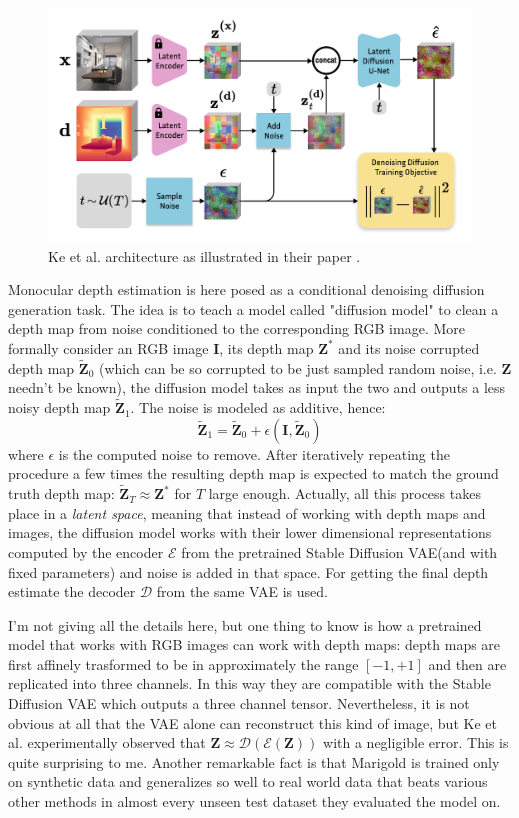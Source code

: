\begin{figure}
	\centering
	\includegraphics[scale=0.3]{figs/marigold}
	\caption{Ke et al. architecture as illustrated in their paper \cite{Marigold}. \label{fig:marigold}}
\end{figure}

Monocular depth estimation is here posed as a conditional denoising diffusion generation task.
The idea is to teach a model called "diffusion model" to clean a depth map from noise conditioned to the corresponding RGB image.
More formally consider an RGB image $\mathbf{I}$, its depth map $\mathbf{Z}^{*}$ and its noise corrupted depth map $\tilde{\mathbf{Z}}_{0}$ (which can be so corrupted to be just sampled random noise, i.e. $\mathbf{Z}$ needn't be known), the diffusion model takes as input the two and outputs a less noisy depth map $\tilde{\mathbf{Z}}_{1}$.
The noise is modeled as additive, hence:
\[
	\tilde{\mathbf{Z}}_{1} = \tilde{\mathbf{Z}}_{0} + \epsilon(\mathbf{I}, \tilde{\mathbf{Z}}_{0})
\]
where $\epsilon$ is the computed noise to remove.
After iteratively repeating the procedure a few times the resulting depth map is expected to match the ground truth depth map: $\tilde{\mathbf{Z}}_{T} \approx \mathbf{Z}^{*}$ for $T$ large enough.
Actually, all this process takes place in a \textit{latent space}, meaning that instead of working with depth maps and images, the diffusion model works with their lower dimensional representations computed by the encoder $\mathcal{E}$ from the pretrained Stable Diffusion VAE(and with fixed parameters) and noise is added in that space.
For getting the final depth estimate the decoder $\mathcal{D}$ from the same VAE is used.

I'm not giving all the details here, but one thing to know is how a pretrained model that works with RGB images can work with depth maps: depth maps are first affinely trasformed to be in approximately the range $[-1, +1]$ and then are replicated into three channels.
In this way they are compatible with the Stable Diffusion VAE which outputs a three channel tensor.
Nevertheless, it is not obvious at all that the VAE alone can reconstruct this kind of image, but Ke et al. experimentally observed that $\mathbf{Z} \approx \mathcal{D}(\mathcal{E}(\mathbf{Z}))$ with a negligible error.
This is quite surprising to me.
Another remarkable fact is that Marigold is trained only on synthetic data and generalizes so well to real world data that beats various other methods in almost every unseen test dataset they evaluated the model on.